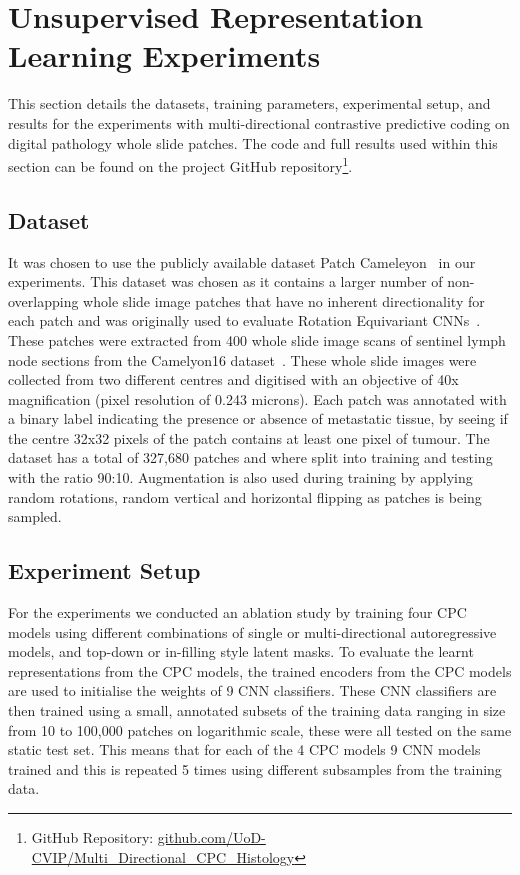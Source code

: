 \section{Unsupervised Representation Learning Experiments}
\label{sec:unsupervised_experiments}
This section details the datasets, training parameters, experimental setup, and results for the experiments with multi-directional contrastive predictive coding on digital pathology whole slide patches. The code and full results used within this section can be found on the project GitHub repository\footnote{GitHub Repository: \url{github.com/UoD-CVIP/Multi_Directional_CPC_Histology}}.

\subsection{Dataset}
\label{subsec:unsupervised_dataset}
It was chosen to use the publicly available dataset Patch Cameleyon~\citep{veeling2018rotation} in our experiments. This dataset was chosen as it contains a larger number of non-overlapping whole slide image patches that have no inherent directionality for each patch and was originally used to evaluate Rotation Equivariant CNNs~\citep{veeling2018rotation}. These patches were extracted from 400 whole slide image scans of sentinel lymph node sections from the Camelyon16 dataset~\citep{litjens20181399}. These whole slide images were collected from two different centres and digitised with an objective of 40x magnification (pixel resolution of 0.243 microns). Each patch was annotated with a binary label indicating the presence or absence of metastatic tissue, by seeing if the centre 32x32 pixels of the patch contains at least one pixel of tumour. The dataset has a total of 327,680 patches and where split into training and testing with the ratio 90:10. Augmentation is also used during training by applying random rotations, random vertical and horizontal flipping as patches is being sampled.

\subsection{Experiment Setup}
\label{subsec:unsupervised_experiment}
For the experiments we conducted an ablation study by training four CPC models using different combinations of single or multi-directional autoregressive models, and top-down or in-filling style latent masks. To evaluate the learnt representations from the CPC models, the trained encoders from the CPC models are used to initialise the weights of 9 CNN classifiers. These CNN classifiers are then trained using a small, annotated subsets of the training data ranging in size from 10 to 100,000 patches on logarithmic scale, these were all tested on the same static test set. This means that for each of the 4 CPC models 9 CNN models trained and this is repeated 5 times using different subsamples from the training data. 

